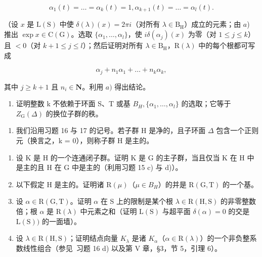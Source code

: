 \[
\alpha_ {1} (t) = \dots = \alpha_ {k} (t) = 1, \alpha_ {k + 1} (t) = \dots = \alpha_ {l} (t).
\]

（设 \(x\) 是 \(\mathrm{L}(\mathrm{S})\) 中使 \(\delta(\lambda)(x) = 2\pi i\)（对所有 \(\lambda \in \mathrm{B}_{\mathrm{H}}\)）成立的元素；由 \(a\)) 推出 \(\exp x \in \mathrm{C}(\mathrm{G})\)。选取 \(\{\alpha_1, \ldots, \alpha_l\}\)，使 \(i\delta(\alpha_j)(x)\) 为零（对 \(1 \leq j \leq k\)）且 \(< 0\)（对 \(k + 1 \leq j \leq l\)）；然后证明对所有 \(\lambda \in \mathrm{B}_{\mathrm{H}}\)，\(\mathrm{R}(\lambda)\) 中的每个根都可写成

\[
\alpha_ {j} + n _ {1} \alpha_ {1} + \dots + n _ {k} \alpha_ {k},
\]

其中 \(j \geq k + 1\) 且 \(n_i \in \mathbf{N}\)。利用 \(a)\) 得出结论。

\begin{enumerate}
\def\labelenumi{\alph{enumi})}
\setcounter{enumi}{2}
\tightlist
\item
  证明整数 k 不依赖于环面 S、T 或基 \(B_{H}, \{\alpha_{1}, \ldots, \alpha_{l}\}\) 的选取；它等于 \(Z_{\mathrm{G}}(\Delta)\) 的换位子群的秩。
\end{enumerate}

\begin{enumerate}
\def\labelenumi{\arabic{enumi})}
\setcounter{enumi}{17}
\tightlist
\item
  我们沿用习题 16 与 17 的记号。若子群 H 是净的，且子环面 \(\Delta\) 包含一个正则元（换言之，k = 0），则称子群 H 是主的。
\end{enumerate}

\begin{enumerate}
\def\labelenumi{\alph{enumi})}
\item
  设 \(\mathrm{K}\) 是 \(\mathrm{H}\) 的一个连通闭子群。证明 \(\mathrm{K}\) 是 \(\mathrm{G}\) 的主子群，当且仅当 \(\mathrm{K}\) 在 \(\mathrm{H}\) 中是主的且 \(\mathrm{H}\) 在 \(\mathrm{G}\) 中是主的（利用习题 15 c) 与 d)）。
\item
  以下假定 H 是主的。证明诸 \(\mathrm{R}(\mu)\)（\(\mu \in B_{H}\)）的并是 \(\mathrm{R}(\mathrm{G}, \mathrm{T})\) 的一个基。
\item
  设 \(\alpha \in \mathrm{R}(\mathrm{G},\mathrm{T})\)。证明 \(\alpha\) 在 S 上的限制是某个根 \(\lambda \in \mathrm{R}(\mathrm{H},\mathrm{S})\) 的非零整数倍；根 \(\alpha\) 是 \(\mathrm{R}(\lambda)\) 中元素之和（证明 \(\mathrm{L}(\mathrm{S})\) 与超平面 \(\delta (\alpha) = 0\) 的交是 \(\mathrm{L}(\mathrm{S}))\) 的一面墙）。
\item
  设 \(\lambda\in\mathrm{R}(\mathrm{H},\mathrm{S})\)；证明结点向量 \(K_{\lambda}\) 是诸 \(K_{\alpha}\)（\(\alpha\in\mathrm{R}(\lambda)\)）的一个非负整系数线性组合（参见~习题 16 d) 以及第 V 章，§3，节 5，引理 6）。
\end{enumerate}

